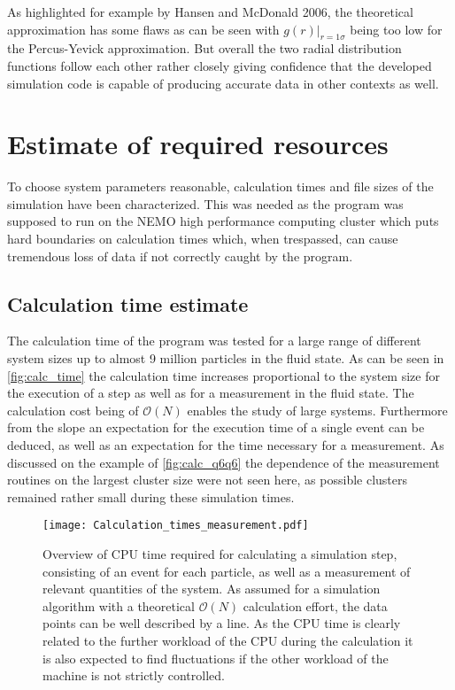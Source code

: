 As highlighted for example by Hansen and McDonald 2006\cite{Hansen2006}, the theoretical approximation has some flaws as can be seen with $g(r)|_{r=1\sigma}$ being too low for the Percus-Yevick approximation. But overall the two radial distribution functions follow each other rather closely giving confidence that the developed simulation code is capable of producing accurate data in other contexts as well.
\FloatBarrier
\section{Estimate of required resources}
\label{sec:resources}
To choose system parameters reasonable, calculation times and file sizes of the simulation have been characterized. This was needed as the program was supposed to run on the NEMO high performance computing cluster which puts hard boundaries on calculation times which, when trespassed, can cause tremendous loss of data if not correctly caught by the program.\\
 
\subsection{Calculation time estimate}
\label{sec:calc_times}
The calculation time of the program was tested for a large range of different system sizes up to almost 9 million particles in the fluid state. As can be seen in \autoref{fig:calc_time} the calculation time increases proportional to the system size for the execution of a step as well as for a measurement in the fluid state. The calculation cost being of $\mathcal{O}(N)$ enables the study of large systems. Furthermore from the slope an expectation for the execution time of a single event can be deduced, as well as an expectation for the time necessary for a measurement. As discussed on the example of \autoref{fig:calc_q6q6} the dependence of the measurement routines on the largest cluster size were not seen here, as possible clusters remained rather small during these simulation times.\\

\begin{figure}[h!]
\centering
\texttt{[image: Calculation\_times\_measurement.pdf]}
\caption[Calculation time estimate]{Overview of CPU time required for calculating a simulation step, consisting of an event for each particle, as well as a measurement of relevant quantities of the system. As assumed for a simulation algorithm with a theoretical $\mathcal{O}(N)$ calculation effort, the data points can be well described by a line. As the CPU time is clearly related to the further workload of the CPU during the calculation it is also expected to find fluctuations if the other workload of the machine is not strictly controlled.}
\label{fig:calc_time}
\end{figure}

